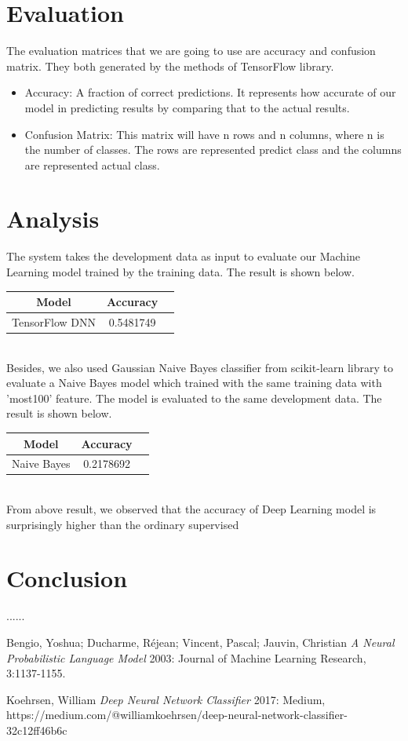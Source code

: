 \documentclass[12pt]{article}
\begin{document}
\section{Evaluation}
The evaluation matrices that we are going to use are accuracy and confusion matrix. They both generated by the methods of TensorFlow library. 
\begin{itemize}
\item Accuracy: A fraction of correct predictions. It represents how accurate of our model in predicting results by comparing that to the actual results.
\item Confusion Matrix: This matrix will have n rows and n columns, where n is the number of classes. The rows are represented predict class and the columns are represented actual class. 
\end{itemize}

\section{Analysis}
The system takes the development data as input to evaluate our Machine Learning model trained by the training data. The result is shown below.
\bigskip \\
\begin{tabular}{|c|c|c|}
      \hline
      Model & Accuracy \\
      \hline
      TensorFlow DNN & 0.5481749 \\
      \hline
\end{tabular}
\bigskip \\
Besides, we also used Gaussian Naive Bayes classifier from scikit-learn library to evaluate a Naive Bayes model which trained with the same training data with 'most100' feature. The model is evaluated to the same development data. The result is shown below.
\bigskip \\
\begin{tabular}{|c|c|c|}
      \hline
      Model & Accuracy \\
      \hline
      Naive Bayes & 0.2178692 \\
      \hline
\end{tabular}
\bigskip \\
From above result, we observed that the accuracy of Deep Learning model is surprisingly higher than the ordinary supervised

\section{Conclusion}
......


\begin{thebibliography}{99}

 Bengio, Yoshua; Ducharme, Réjean; Vincent, Pascal; Jauvin, Christian {\em A Neural Probabilistic Language Model} 2003: Journal of Machine Learning Research, 3:1137-1155.

 Koehrsen, William {\em Deep Neural Network Classifier} 2017: Medium, https://medium.com/@williamkoehrsen/deep-neural-network-classifier-32c12ff46b6c

\end{thebibliography}
  
\end{document}

